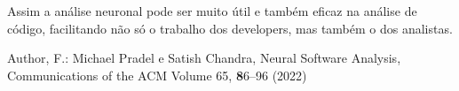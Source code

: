 \documentclass{article}
\begin{document}
Assim a análise neuronal pode ser muito útil e também eficaz na análise de código, facilitando não só o trabalho dos developers, mas também o dos analistas.
\begin{thebibliography}{8}
 Author, F.: Michael Pradel e Satish Chandra, Neural Software Analysis,
Communications of the ACM Volume 65,
\textbf 86–96 (2022)
\end{thebibliography}
\end{document}
